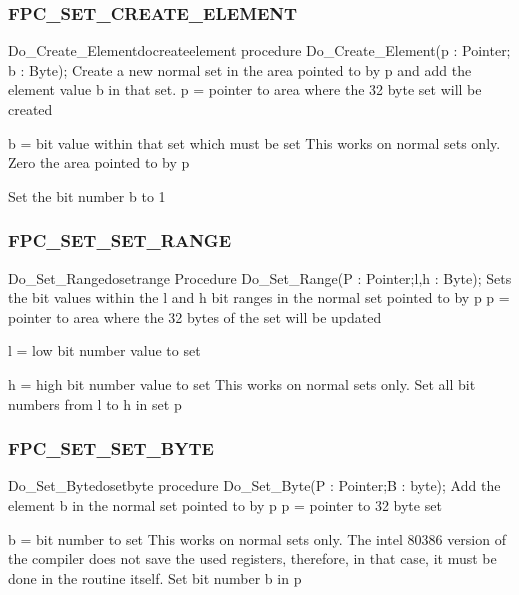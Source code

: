 \documentclass [a4paper,12pt]{article}
\begin{document}
\subsubsection{FPC{\_}SET{\_}CREATE{\_}ELEMENT}
\label{subsubsec:mylabel88}

\begin{procedurel}{Do{\_}Create{\_}Element}{docreateelement}
\Declaration
procedure Do{\_}Create{\_}Element(p : Pointer; b : Byte);
\Description
Create a new normal set in the area pointed to by \textsf{p} and add the
element value \textsf{b} in that set.
\Parameters
p = pointer to area where the 32 byte set will be created \par
b = bit value within that set which must be set
\Notes
This works on normal sets only.
\Algorithm
Zero the area pointed to by p \par
Set the bit number b to 1
\end{procedurel}

\subsubsection{FPC{\_}SET{\_}SET{\_}RANGE}
\label{subsubsec:mylabel89}

\begin{procedurel}{Do{\_}Set{\_}Range}{dosetrange}
\Declaration
Procedure Do{\_}Set{\_}Range(P : Pointer;l,h : Byte);
\Description
Sets the bit values within the \textsf{l} and \textsf{h }bit ranges in the
normal set pointed to by \textsf{p}
\Parameters
p = pointer to area where the 32 bytes of the set will be updated \par
l = low bit number value to set \par
h = high bit number value to set
\Notes
This works on normal sets only.
\Algorithm
Set all bit numbers from l to h in set p
\end{procedurel}

\subsubsection{FPC{\_}SET{\_}SET{\_}BYTE}
\label{subsubsec:mylabel90}

\begin{procedurel}{Do{\_}Set{\_}Byte}{dosetbyte}
\Declaration
procedure Do{\_}Set{\_}Byte(P : Pointer;B : byte);
\Description
Add the element \textsf{b} in the normal set pointed to by \textsf{p}
\Parameters
p = pointer to 32 byte set \par
b = bit number to set
\Notes
This works on normal sets only. The intel 80386 version of the compiler does
not save the used registers, therefore, in that case, it must be done in the
routine itself.
\Algorithm
Set bit number b in p
\end{procedurel}
\end{document}
